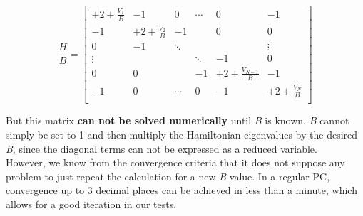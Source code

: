 \documentclass[12pt,a4paper]{article}
\begin{document}
\[
    \frac{H}{B} =
    \left[ {\begin{array}{cccccc}
     +2 +\frac{V_1}{B}  &  -1                &  0     & \cdots &  0                     &  -1                \\
     -1                 & +2 +\frac{V_2}{B}  &  -1    &        &  0                     &  0                 \\
     0                  &  -1                & \ddots &        &                        &  \vdots            \\
     \vdots             &                    &        & \ddots &  -1                    &  0                 \\
     0                  &  0                 &        &  -1    & +2 +\frac{V_{N-1}}{B}  &  -1                \\
     -1                 &  0                 & \cdots &  0     &  -1                    & +2 +\frac{V_N}{B}  \\
    \end{array} } \right]
\]

But this matrix \textbf{can not be solved numerically} until \textit{B} is known.
\textit{B} cannot simply be set to 1 and then multiply the Hamiltonian eigenvalues by the desired \textit{B}, since the diagonal terms can not be expressed as a reduced variable.\\

However, we know from the convergence criteria that it does not suppose any problem to just repeat the calculation for a new \textit{B} value. In a regular PC, convergence up to 3 decimal places can be achieved in less than a minute, which allows for a good iteration in our tests.\\


\end{document}
